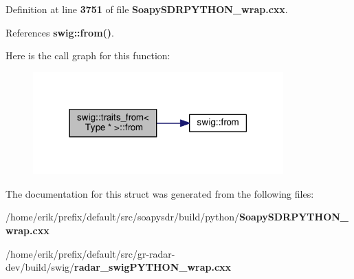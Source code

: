 Definition at line {\bf 3751} of file {\bf Soapy\+S\+D\+R\+P\+Y\+T\+H\+O\+N\+\_\+wrap.\+cxx}.



References {\bf swig\+::from()}.



Here is the call graph for this function\+:
\nopagebreak
\begin{figure}[H]
\begin{center}
\leavevmode
\includegraphics[width=273pt]{d8/d62/structswig_1_1traits__from_3_01Type_01_5_01_4_a9df365d214884ed1c08f71211f5925ad_cgraph}
\end{center}
\end{figure}




The documentation for this struct was generated from the following files\+:\begin{DoxyCompactItemize}
\item 
/home/erik/prefix/default/src/soapysdr/build/python/{\bf Soapy\+S\+D\+R\+P\+Y\+T\+H\+O\+N\+\_\+wrap.\+cxx}\item 
/home/erik/prefix/default/src/gr-\/radar-\/dev/build/swig/{\bf radar\+\_\+swig\+P\+Y\+T\+H\+O\+N\+\_\+wrap.\+cxx}\end{DoxyCompactItemize}
